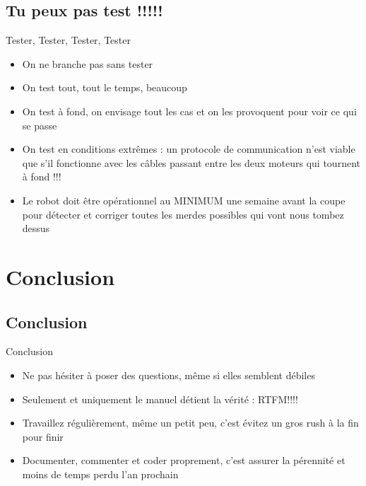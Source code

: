 \documentclass{beamer}
\begin{document}
\subsection{Tu peux pas test !!!!!}
\begin{frame}{Tester, Tester, Tester, Tester}
	\begin{itemize}
		\item On ne branche pas sans tester
		\item On test tout, tout le temps, beaucoup
		\item On test à fond, on envisage tout les cas et on les provoquent pour voir ce qui se passe
		\item On test en conditions extrêmes : un protocole de communication n'est viable que s'il fonctionne avec les câbles passant entre les deux moteurs qui tournent à fond !!!
		\item Le robot doit être opérationnel au MINIMUM une semaine avant la coupe pour détecter et corriger toutes les merdes possibles qui vont nous tombez dessus
	\end{itemize}
\end{frame}

\section{Conclusion}
\subsection{Conclusion}
\begin{frame}{Conclusion}
	\begin{itemize}
		\item Ne pas hésiter à poser des questions, même si elles semblent débiles
		\item Seulement et uniquement le manuel détient la vérité : RTFM!!!!
		\item Travaillez régulièrement, même un petit peu, c'est évitez un gros rush à la fin pour finir
		\item Documenter, commenter et coder proprement, c'est assurer la pérennité et moins de temps perdu l'an prochain
	\end{itemize}
\end{frame}
\end{document}
